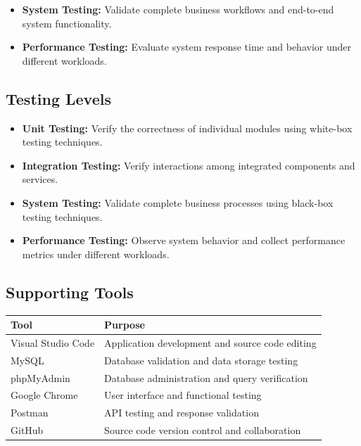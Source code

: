 \documentclass[12pt,a4paper]{article}
\begin{document}
{{\begin{itemize}
	\item \textbf{System Testing:} Validate complete business workflows and end-to-end system functionality.
	
	\item \textbf{Performance Testing:} Evaluate system response time and behavior under different workloads.
\end{itemize}
\subsection{Testing Levels}
\begin{itemize}
	\item \textbf{Unit Testing:}
	Verify the correctness of individual modules using white-box testing techniques.
	
	\item \textbf{Integration Testing:}
	Verify interactions among integrated components and services.
	
	\item \textbf{System Testing:}
	Validate complete business processes using black-box testing techniques.
	
	\item \textbf{Performance Testing:}
	Observe system behavior and collect performance metrics under different workloads.
\end{itemize}
\subsection{Supporting Tools}

\begin{table}[H]
	\centering
	\begin{tabular}{|p{4cm}|p{8cm}|}
		\hline
		\textbf{Tool} & \textbf{Purpose} \\ \hline
		Visual Studio Code & Application development and source code editing \\ \hline
		MySQL & Database validation and data storage testing \\ \hline
		phpMyAdmin & Database administration and query verification \\ \hline
		Google Chrome & User interface and functional testing \\ \hline
		Postman & API testing and response validation \\ \hline
		GitHub & Source code version control and collaboration \\ \hline
	\end{tabular}
	\label{tab:supporting_tools}
	

\end{table}}}
\end{document}
